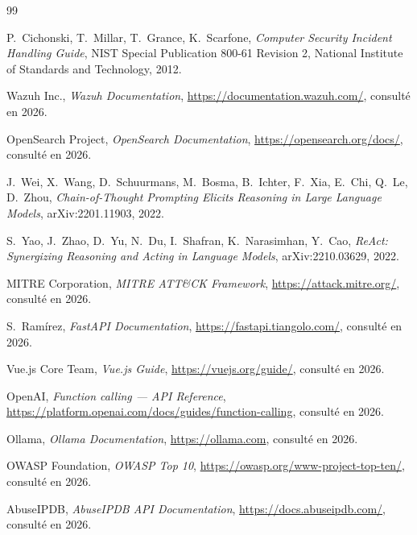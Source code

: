 \begin{thebibliography}{99}

P.~Cichonski, T.~Millar, T.~Grance, K.~Scarfone,
\textit{Computer Security Incident Handling Guide},
NIST Special Publication 800-61 Revision 2,
National Institute of Standards and Technology, 2012.

Wazuh Inc., \textit{Wazuh Documentation},
\url{https://documentation.wazuh.com/}, consulté en 2026.

OpenSearch Project, \textit{OpenSearch Documentation},
\url{https://opensearch.org/docs/}, consulté en 2026.

J.~Wei, X.~Wang, D.~Schuurmans, M.~Bosma, B.~Ichter, F.~Xia, E.~Chi, Q.~Le,
D.~Zhou,
\textit{Chain-of-Thought Prompting Elicits Reasoning in Large Language
Models}, arXiv:2201.11903, 2022.

S.~Yao, J.~Zhao, D.~Yu, N.~Du, I.~Shafran, K.~Narasimhan, Y.~Cao,
\textit{ReAct: Synergizing Reasoning and Acting in Language Models},
arXiv:2210.03629, 2022.

MITRE Corporation, \textit{MITRE ATT\&CK Framework},
\url{https://attack.mitre.org/}, consulté en 2026.

S.~Ramírez, \textit{FastAPI Documentation},
\url{https://fastapi.tiangolo.com/}, consulté en 2026.

Vue.js Core Team, \textit{Vue.js Guide},
\url{https://vuejs.org/guide/}, consulté en 2026.

OpenAI, \textit{Function calling --- API Reference},
\url{https://platform.openai.com/docs/guides/function-calling}, consulté
en 2026.

Ollama, \textit{Ollama Documentation},
\url{https://ollama.com}, consulté en 2026.

OWASP Foundation, \textit{OWASP Top 10},
\url{https://owasp.org/www-project-top-ten/}, consulté en 2026.

AbuseIPDB, \textit{AbuseIPDB API Documentation},
\url{https://docs.abuseipdb.com/}, consulté en 2026.

\end{thebibliography}
